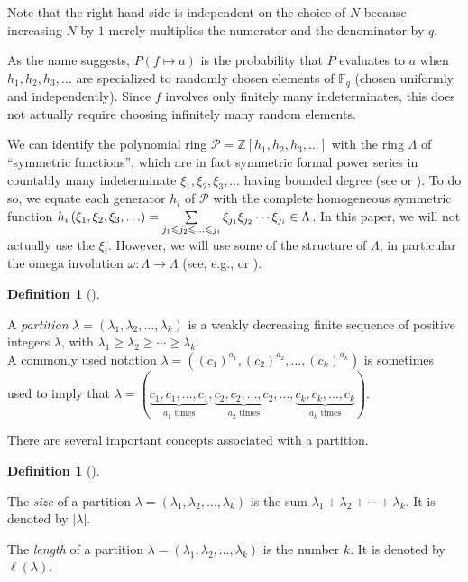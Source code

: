 \documentclass[numbers=enddot,12pt,final,onecolumn,notitlepage]{scrartcl}%
\theoremstyle{definition}
\newtheorem{defi}[theo]{Definition}
\newenvironment{definition}[1][]
{\begin{defi}[#1]\begin{leftbar}}
{\end{leftbar}\end{defi}}
\let\sumnonlimits\sum
\renewcommand{\sum}{\sumnonlimits\limits}
\newcommand{\abs}[1]{\left| #1 \right|}
\newcommand{\tup}[1]{\left( #1 \right)}
\newcommand{\Fq}{\mathbb{F}_q}
\renewcommand{\leq}{\leqslant}
\renewcommand{\geq}{\geqslant}
\theoremstyle{plainsl}
\begin{document}
Note that the right hand side is independent on the choice of $N$
because increasing $N$ by $1$
merely multiplies the numerator and the denominator by $q$.

As the name suggests, $P\tup{f \mapsto a}$ is the probability that
$P$ evaluates to $a$ when $h_1, h_2, h_3, \ldots$ are specialized
to randomly chosen elements of $\Fq$ (chosen uniformly and
independently). Since $f$ involves only finitely many indeterminates,
this does not actually require choosing infinitely many random
elements.

We can identify the polynomial ring
$\mathcal{P}=\mathbb{Z}\left[  h_{1},h_{2},h_{3},\ldots\right]  $
with the ring $\Lambda$ of ``symmetric
functions'', which are in fact symmetric formal power series in
countably many indeterminate $\xi_{1},\xi_{2},\xi_{3},\ldots$
having bounded degree (see \cite[Section 7.1]{EC2} or
\cite[Section I.2]{Macdonald}).
To do so, we equate each generator $h_i$ of $\mathcal{P}$
with the complete homogeneous symmetric function
$h_i\tup{\xi_1, \xi_2, \xi_3, \ldots}
= \sum\limits_{j_1 \leq j_2 \leq \ldots \leq j_i}
\xi_{j_1} \xi_{j_2} \cdots \xi_{j_i} \in \Lambda$.
In this paper, we will not actually use the $\xi_i$.
However, we will use some of the structure of $\Lambda$, in
particular the omega involution $\omega : \Lambda \to \Lambda$
(see, e.g., \cite[Section 7.6]{EC2} or \cite[(I.2.7)]{Macdonald}).

\begin{definition}
A \emph{partition} $\lambda = \left(\lambda_1, \lambda_2, \ldots, \lambda_k\right)$ is a
weakly decreasing finite sequence of positive integers
$\lambda$, with
$\lambda_1 \geq \lambda_2 \geq \cdots \geq \lambda_k$. \\

A commonly used notation $\lambda =((c_1)^{a_1}, (c_2)^{a_2}, \ldots, (c_k)^{a_k})$  is sometimes used to imply that $\lambda = ( \underbrace{c_1,c_1,\ldots,c_1}_{a_1
\text{ times}},  \underbrace{c_2,c_2,\ldots,c_2}_{a_2
\text{ times}}, \ldots, \underbrace{c_k,c_k,\ldots,c_k}_{a_k
\text{ times}}
)$.
\end{definition}


There are several important concepts associated with a partition.

\begin{definition}
The \emph{size} of a partition
$\lambda = \left(\lambda_1, \lambda_2, \ldots, \lambda_k\right)$
is the sum $\lambda_1 + \lambda_2 + \cdots + \lambda_k$.
It is denoted by $\abs{\lambda}$.

The \emph{length} of a partition
$\lambda = \left(\lambda_1, \lambda_2, \ldots, \lambda_k\right)$
is the number $k$.
It is denoted by $\ell\tup{\lambda}$.
\end{definition}
\end{document}
